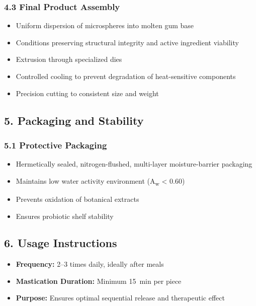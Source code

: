 \documentclass[12pt]{article}
\begin{document}
\subsubsection*{4.3 Final Product Assembly}
\begin{itemize}
    \item Uniform dispersion of microspheres into molten gum base
    \item Conditions preserving structural integrity and active ingredient viability
    \item Extrusion through specialized dies
    \item Controlled cooling to prevent degradation of heat-sensitive components
    \item Precision cutting to consistent size and weight
\end{itemize}

\subsection*{5. Packaging and Stability}

\subsubsection*{5.1 Protective Packaging}
\begin{itemize}
    \item Hermetically sealed, nitrogen-flushed, multi-layer moisture-barrier packaging
    \item Maintains low water activity environment (A\textsubscript{w} < 0.60)
    \item Prevents oxidation of botanical extracts
    \item Ensures probiotic shelf stability
\end{itemize}

\subsection*{6. Usage Instructions}
\begin{itemize}
    \item \textbf{Frequency:} 2--3 times daily, ideally after meals
    \item \textbf{Mastication Duration:} Minimum \SI{15}{\minute} per piece
    \item \textbf{Purpose:} Ensures optimal sequential release and therapeutic effect
\end{itemize}
\end{document}
